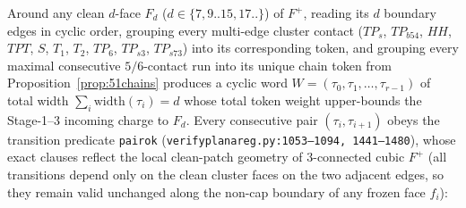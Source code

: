 \documentclass[11pt,reqno]{amsart}
\theoremstyle{plain}
\theoremstyle{definition}
\theoremstyle{remark}
\DeclareRobustCommand{\_}{\ifmmode\text{\textunderscore}\else\textunderscore\allowbreak\fi}
\begin{document}
Around any clean $d$-face $F_d$ ($d \in \{7, 9..15, 17..\}$) of $F^+$, reading its $d$ boundary edges in cyclic order, grouping every multi-edge cluster contact ($TP_s$, $TP_{b54}$, $HH$, $TPT$, $S$, $T_1$, $T_2$, $TP_6$, $TP_{s3}$, $TP_{s73}$) into its corresponding token, and grouping every maximal consecutive $5/6$-contact run into its unique chain token from Proposition~\ref{prop:51chains} produces a cyclic word $W = (\tau_0, \tau_1, \dots, \tau_{r-1})$ of total width $\sum_i \mathrm{width}(\tau_i) = d$ whose total token weight upper-bounds the Stage-1--3 incoming charge to $F_d$. Every consecutive pair $(\tau_i, \tau_{i+1})$ obeys the transition predicate \texttt{pair\_ok} (\texttt{verify\_planar\_eg.py:1053--1094, 1441--1480}), whose exact clauses reflect the local clean-patch geometry of $3$-connected cubic $F^+$ (all transitions depend only on the clean cluster faces on the two adjacent edges, so they remain valid unchanged along the non-cap boundary of any frozen face $f_i$):
\end{document}
